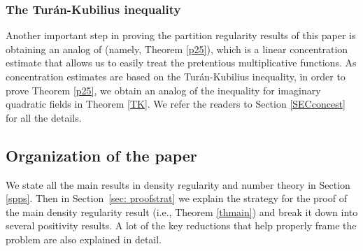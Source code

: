 \documentclass[11pt]{amsart}
\theoremstyle{definition}
\newcommand{\WS}[1]{{\color{blue}{{#1}}}}
\begin{document}

\subsubsection{The Tur\'an-Kubilius inequality}
Another important step in proving the partition regularity results of this paper is obtaining an analog of \cite[Proposition~2.5]{FKM1} (namely, Theorem \ref{p25}), which is a linear concentration estimate that allows us to easily treat the pretentious multiplicative functions. As concentration estimates are based on the Tur\'an-Kubilius inequality, in order to prove  Theorem \ref{p25}, we obtain an analog of the inequality for imaginary quadratic fields in Theorem \ref{TK}.
We refer the readers to Section \ref{SECconcest} for all the details.

\subsection{Organization of the paper}
We state all the main results in density regularity and number theory in Section \ref{spps}.
Then in Section~\ref{sec: proofstrat} we explain the strategy  for the proof  of the main density regularity result (i.e., Theorem \ref{thmain}) %
and break it down into several positivity results. A lot of the key reductions that help properly frame the problem are also explained in detail.
\end{document}
